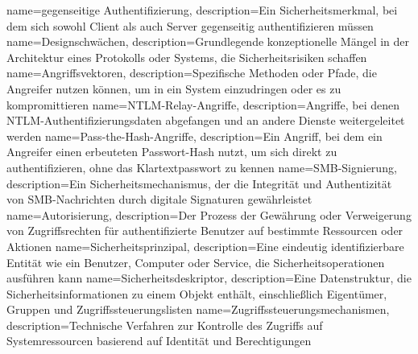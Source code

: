 {
	name={ge\-gen\-sei\-ti\-ge Au\-then\-ti\-fi\-zie\-rung},
	description={Ein Si\-cher\-heits\-merk\-mal, bei dem sich so\-wohl Cli\-ent als auch Ser\-ver ge\-gen\-sei\-tig au\-then\-ti\-fi\-zie\-ren müs\-sen}
}
{
	name={De\-sign\-schwä\-chen},
	description={Grund\-le\-gen\-de kon\-zep\-tio\-nel\-le Män\-gel in der Ar\-chi\-tek\-tur ei\-nes Pro\-to\-kolls oder Sys\-tems, die Si\-cher\-heits\-ri\-si\-ken schaf\-fen}
}
{
	name={An\-griffs\-vek\-to\-ren},
	description={Spe\-zi\-fi\-sche Me\-tho\-den oder Pfa\-de, die An\-grei\-fer nut\-zen kön\-nen, um in ein Sys\-tem ein\-zu\-drin\-gen oder es zu kom\-pro\-mit\-tie\-ren}
}
{
	name={NTLM-Re\-lay-An\-grif\-fe},
	description={An\-grif\-fe, bei de\-nen NTLM-Au\-then\-ti\-fi\-zie\-rungs\-da\-ten ab\-ge\-fan\-gen und an an\-de\-re Diens\-te wei\-ter\-ge\-lei\-tet wer\-den}
}
{
	name={Pass-the-Hash-An\-grif\-fe},
	description={Ein An\-griff, bei dem ein An\-grei\-fer ei\-nen er\-beu\-te\-ten Pass\-wort-Hash nutzt, um sich di\-rekt zu au\-then\-ti\-fi\-zie\-ren, ohne das Klar\-text\-pass\-wort zu ken\-nen}
}
{
	name={SMB-Si\-gnie\-rung},
	description={Ein Si\-cher\-heits\-me\-cha\-nis\-mus, der die In\-te\-gri\-tät und Au\-then\-ti\-zi\-tät von SMB-Nach\-rich\-ten durch di\-gi\-ta\-le Si\-gna\-tu\-ren ge\-währ\-leis\-tet}
}
{
	name={Au\-to\-ri\-sie\-rung},
	description={Der Pro\-zess der Ge\-wäh\-rung oder Ver\-wei\-ge\-rung von Zu\-griffs\-rech\-ten für au\-then\-ti\-fi\-zier\-te Be\-nut\-zer auf be\-stimm\-te Res\-sour\-cen oder Ak\-tio\-nen}
}
{
	name={Si\-cher\-heits\-prin\-zi\-pal},
	description={Eine ein\-deu\-tig iden\-ti\-fi\-zier\-ba\-re En\-ti\-tät wie ein Be\-nut\-zer, Com\-pu\-ter oder Ser\-vice, die Si\-cher\-heits\-ope\-ra\-tio\-nen aus\-füh\-ren kann}
}
{
	name={Si\-cher\-heits\-de\-skrip\-tor},
	description={Eine Da\-ten\-struk\-tur, die Si\-cher\-heits\-in\-for\-ma\-tio\-nen zu ei\-nem Ob\-jekt ent\-hält, ein\-schließ\-lich Ei\-gen\-tü\-mer, Grup\-pen und Zu\-griffs\-steue\-rungs\-lis\-ten}
}
{
	name={Zu\-griffs\-steue\-rungs\-me\-cha\-nis\-men},
	description={Tech\-ni\-sche Ver\-fah\-ren zur Kon\-trol\-le des Zu\-griffs auf Sys\-tem\-res\-sour\-cen ba\-sie\-rend auf Iden\-ti\-tät und Be\-rech\-ti\-gun\-gen}
}

